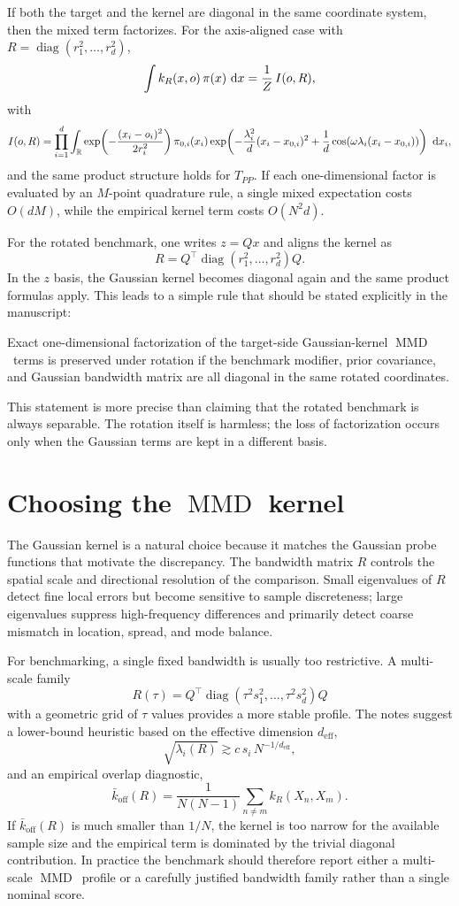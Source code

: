 \documentclass[11pt,a4paper]{article}
\def\d{\,{\rm d}}
\def\Real{\mathbb R}
\DeclareMathOperator{\diag}{diag}
\DeclareMathOperator{\MMDop}{MMD}
\newcommand{\MMD}{\ensuremath{\MMDop}\xspace}
\begin{document}
If both the target and the kernel are diagonal in the same coordinate system, then the mixed term factorizes. For the axis-aligned case with $R=\diag(r_1^2,\dots,r_d^2)$,
\[
\int k_R(x,o)\,\pi(x)\,\d x
=
\frac{1}{Z}\,I(o,R),
\]
with
\[
I(o,R)
=
\prod_{i=1}^d
\int_{\Real}
\exp\!\left(-\frac{(x_i-o_i)^2}{2r_i^2}\right)
\pi_{0,i}(x_i)
\exp\!\left(
-\frac{\lambda_i^2}{d}(x_i-x_{0,i})^2
+ \frac{1}{d}\cos(\omega \lambda_i (x_i-x_{0,i}))
\right)\,\d x_i,
\]
and the same product structure holds for $T_{PP}$. If each one-dimensional factor is evaluated by an $M$-point quadrature rule, a single mixed expectation costs $O(dM)$, while the empirical kernel term costs $O(N^2 d)$.

For the rotated benchmark, one writes $z=Qx$ and aligns the kernel as
\[
R = Q^\top \diag(r_1^2,\dots,r_d^2)Q.
\]
In the $z$ basis, the Gaussian kernel becomes diagonal again and the same product formulas apply. This leads to a simple rule that should be stated explicitly in the manuscript:

\begin{mdframed}
Exact one-dimensional factorization of the target-side Gaussian-kernel \MMD\ terms is preserved under rotation if the benchmark modifier, prior covariance, and Gaussian bandwidth matrix are all diagonal in the same rotated coordinates.
\end{mdframed}

This statement is more precise than claiming that the rotated benchmark is always separable. The rotation itself is harmless; the loss of factorization occurs only when the Gaussian terms are kept in a different basis.

\section{Choosing the \texorpdfstring{\MMD}{MMD} kernel}

The Gaussian kernel is a natural choice because it matches the Gaussian probe functions that motivate the discrepancy. The bandwidth matrix $R$ controls the spatial scale and directional resolution of the comparison. Small eigenvalues of $R$ detect fine local errors but become sensitive to sample discreteness; large eigenvalues suppress high-frequency differences and primarily detect coarse mismatch in location, spread, and mode balance.

For benchmarking, a single fixed bandwidth is usually too restrictive. A multi-scale family
\[
R(\tau) = Q^\top \diag(\tau^2 s_1^2,\dots,\tau^2 s_d^2)Q
\]
with a geometric grid of $\tau$ values provides a more stable profile. The notes suggest a lower-bound heuristic based on the effective dimension $d_{\mathrm{eff}}$,
\[
\sqrt{\lambda_i(R)} \gtrsim c\,s_i\,N^{-1/d_{\mathrm{eff}}},
\]
and an empirical overlap diagnostic,
\[
\bar{k}_{\mathrm{off}}(R)
=
\frac{1}{N(N-1)}\sum_{n \neq m} k_R(X_n,X_m).
\]
If $\bar{k}_{\mathrm{off}}(R)$ is much smaller than $1/N$, the kernel is too narrow for the available sample size and the empirical term is dominated by the trivial diagonal contribution. In practice the benchmark should therefore report either a multi-scale \MMD\ profile or a carefully justified bandwidth family rather than a single nominal score.
\end{document}
